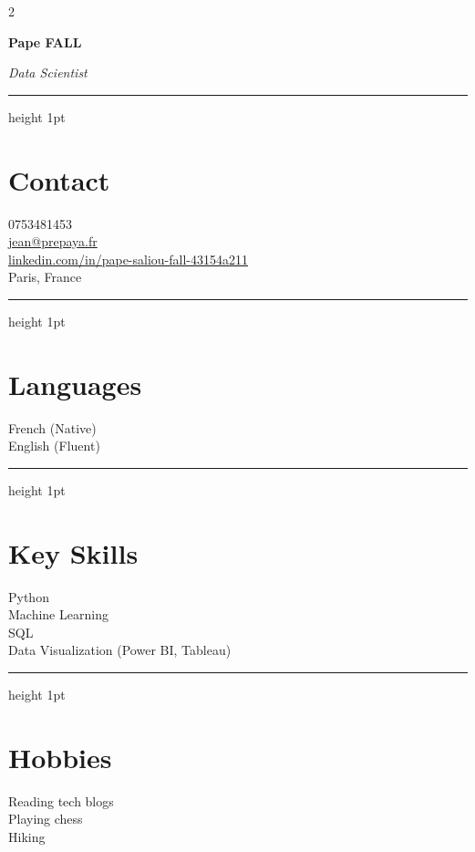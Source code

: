 \documentclass[10pt,letterpaper]{article}
\newcommand{\cvName}[1]{\vspace*{0.3in}\textbf{\LARGE #1}}
\newcommand{\cvHeadline}[1]{\par\smallskip\textit{#1}}
\newcommand{\cvHr}{\vspace{0.5\baselineskip}\hrule height 1pt\color{primary}\vspace{0.7\baselineskip}}
\begin{document}
\small
\begin{paracol}{2}

\begin{leftcolumn}
\begin{center}
\end{center}

\vspace{0.6in}

\cvName{Pape FALL}
\cvHeadline{Data Scientist}
\cvHr

\section*{Contact}
0753481453\\
\href{mailto:jean@prepaya.fr}{jean@prepaya.fr}\\
\href{https://www.linkedin.com/in/pape-saliou-fall-43154a211}{linkedin.com/in/pape-saliou-fall-43154a211}\\
Paris, France

\cvHr
\section*{Languages}
French (Native)\\
English (Fluent)

\cvHr
\section*{Key Skills}
Python\\
Machine Learning\\
SQL\\
Data Visualization (Power BI, Tableau)

\cvHr
\section*{Hobbies}
Reading tech blogs\\
Playing chess\\
Hiking
\end{leftcolumn}


\end{paracol}
\end{document}
